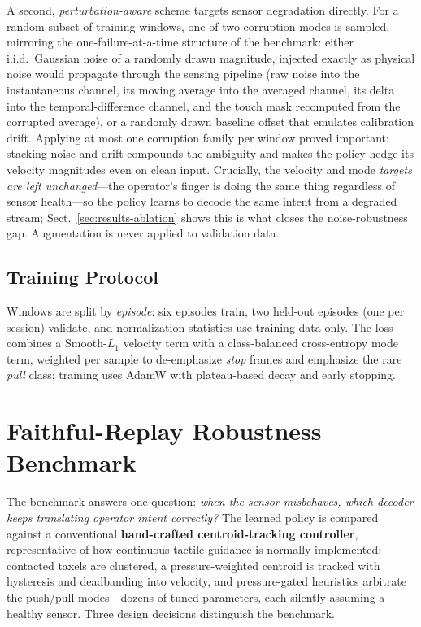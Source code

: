 \documentclass[runningheads]{llncs}
\begin{document}
A second, \emph{perturbation-aware} scheme targets sensor degradation
directly. For a random subset of training windows, one of two corruption
modes is sampled, mirroring the one-failure-at-a-time structure of the
benchmark: either i.i.d.\ Gaussian noise of a randomly drawn magnitude,
injected exactly as physical noise would propagate through the sensing
pipeline (raw noise into the instantaneous channel, its moving average
into the averaged channel, its delta into the temporal-difference
channel, and the touch mask recomputed from the corrupted average), or a
randomly drawn baseline offset that emulates calibration drift.
Applying at most one corruption family per window
proved important: stacking noise and drift compounds the ambiguity and
makes the policy hedge its velocity magnitudes even on clean input.
Crucially, the velocity and mode \emph{targets are left unchanged}---the
operator's finger is doing the same thing regardless of sensor
health---so the policy learns to decode the same intent from a degraded
stream; Sect.~\ref{sec:results-ablation} shows this is what closes the
noise-robustness gap. Augmentation is never applied to validation data.

\subsection{Training Protocol}

Windows are split by \emph{episode}: six episodes train, two held-out
episodes (one per session) validate, and normalization statistics use
training data only. The loss combines a Smooth-$L_1$ velocity term with
a class-balanced cross-entropy mode term, weighted per sample to
de-emphasize \emph{stop} frames and emphasize the rare \emph{pull}
class; training uses AdamW with plateau-based decay and early stopping.

\section{Faithful-Replay Robustness Benchmark}
\label{sec:benchmark}

The benchmark answers one question: \emph{when the sensor misbehaves,
which decoder keeps translating operator intent correctly?} The learned
policy is compared against a conventional \textbf{hand-crafted
centroid-tracking controller}, representative of how continuous tactile
guidance is normally implemented: contacted taxels are clustered, a
pressure-weighted centroid is tracked with hysteresis and deadbanding
into velocity, and pressure-gated heuristics arbitrate the push/pull
modes---dozens of tuned parameters, each silently assuming a healthy
sensor. Three design decisions distinguish the benchmark.
\end{document}
